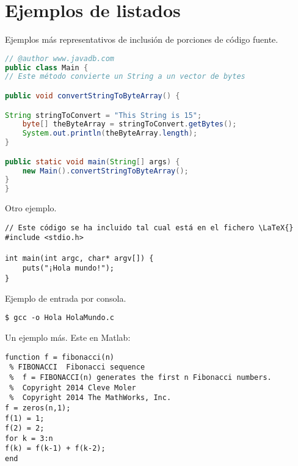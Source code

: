 \section{Ejemplos de listados}
\label{sec:ejListados}

Ejemplos más representativos de inclusión de porciones de código 
fuente.

\begin{lstlisting}[language=Java,float=ht,caption={[Código fuente en Java]Ejemplo de código fuente en lenguaje Java},label=lst:java]
// @author www.javadb.com
public class Main {    
// Este método convierte un String a un vector de bytes

public void convertStringToByteArray() {

String stringToConvert = "This String is 15";      
	byte[] theByteArray = stringToConvert.getBytes();        
	System.out.println(theByteArray.length);        
}

public static void main(String[] args) {
	new Main().convertStringToByteArray();
}
}
\end{lstlisting}



\noindent Otro ejemplo.

\begin{lstlisting}[style=C-ruled,float=ht,caption={Ejemplo de código C},label=lst:codC]
// Este código se ha incluido tal cual está en el fichero \LaTeX{}
#include <stdio.h>

int main(int argc, char* argv[]) {
	puts("¡Hola mundo!");
}
\end{lstlisting}


\noindent Ejemplo de entrada por consola.

\begin{lstlisting}[style=consola, numbers=none]
$ gcc -o Hola HolaMundo.c
\end{lstlisting}


\noindent Un ejemplo más. Este en Matlab:
\spanishplainpercent
\begin{lstlisting}[style=Matlab-color,float=ht,caption={Ejemplo escrito en Matlab},label=lst:matlab]
function f = fibonacci(n)
 % FIBONACCI  Fibonacci sequence
 %	f = FIBONACCI(n) generates the first n Fibonacci numbers.
 %	Copyright 2014 Cleve Moler
 %	Copyright 2014 The MathWorks, Inc.
f = zeros(n,1); 
f(1) = 1;
f(2) = 2;
for k = 3:n
f(k) = f(k-1) + f(k-2);
end
\end{lstlisting}
\spanishpercent

